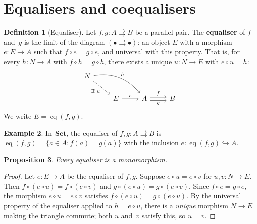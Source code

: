 \documentclass[a4paper,12pt]{book}
\DeclareMathOperator{\eq}{eq}
\newcommand{\Set}{\mathbf{Set}}
\theoremstyle{definition}
\newtheorem{definition}{Definition}[section]
\newtheorem{example}[definition]{Example}
\theoremstyle{plain}
\newtheorem{proposition}[definition]{Proposition}
\theoremstyle{remark}
\begin{document}
\section{Equalisers and coequalisers}\label{sec:equalisers}

\begin{definition}[Equaliser]\label{def:equaliser}
Let $f,g\colon A\rightrightarrows B$ be a parallel pair.
The \textbf{equaliser} of $f$ and~$g$ is the limit of the diagram
$(\bullet\rightrightarrows\bullet)$: an object $E$ with a morphism
$e\colon E\to A$ such that $f\circ e = g\circ e$,
and universal with this property.
That is, for every $h\colon N\to A$ with $f\circ h = g\circ h$,
there exists a unique $u\colon N\to E$ with $e\circ u = h$:
\[
\begin{tikzcd}
N \arrow[dr, dashed, "\exists!\,u"'] \arrow[drr, bend left, "h"] & & \\
& E \arrow[r, "e"] & A \arrow[r, shift left, "f"] \arrow[r, shift right, "g"'] & B
\end{tikzcd}
\]
We write $E = \eq(f,g)$.
\end{definition}

\begin{example}\label{ex:equaliser-set}
\index{equaliser!in Set@in $\Set$}
In~$\Set$, the equaliser of $f,g\colon A\rightrightarrows B$ is
$\eq(f,g) = \{a\in A : f(a) = g(a)\}$
with the inclusion $e\colon\eq(f,g)\hookrightarrow A$.
\end{example}

\begin{proposition}\label{prop:equaliser-mono}
Every equaliser is a monomorphism.
\end{proposition}

\begin{proof}
Let $e\colon E\to A$ be the equaliser of $f,g$.
Suppose $e\circ u = e\circ v$ for $u,v\colon N\to E$.
Then $f\circ(e\circ u) = f\circ(e\circ v)$ and
$g\circ(e\circ u) = g\circ(e\circ v)$.
Since $f\circ e = g\circ e$, the morphism $e\circ u = e\circ v$
satisfies $f\circ(e\circ u) = g\circ(e\circ u)$.
By the universal property of the equaliser applied to $h = e\circ u$,
there is a \emph{unique} morphism $N\to E$ making the triangle commute;
both $u$ and~$v$ satisfy this, so $u = v$.
\end{proof}
\end{document}
